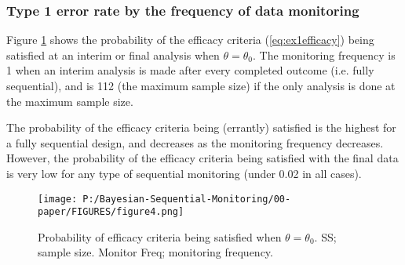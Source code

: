 \documentclass[12pt]{article}
\begin{document}
\subsubsection{Type 1 error rate by the frequency of data monitoring}
Figure \ref{fig:ex1t1e} shows the probability of the efficacy criteria (\ref{eq:ex1efficacy}) being satisfied at an interim or final analysis when $\theta=\theta_0$. The monitoring frequency is 1 when an interim analysis is made after every completed outcome (i.e. fully sequential), and is 112 (the maximum sample size) if the only analysis is done at the maximum sample size. 

The probability of the efficacy criteria being (errantly) satisfied is the highest for a fully sequential design, and decreases as the monitoring frequency decreases. However, the probability of the efficacy criteria being satisfied with the final data is very low for any type of sequential monitoring (under 0.02 in all cases).
\begin{figure}\begin{center}

    \texttt{[image: P:/Bayesian-Sequential-Monitoring/00-paper/FIGURES/figure4.png]}
    \caption{Probability of efficacy criteria being satisfied when $\theta=\theta_0$. SS; sample size. Monitor Freq; monitoring frequency.}
	\label{fig:ex1t1e}

 
\end{center}\end{figure}
\end{document}

